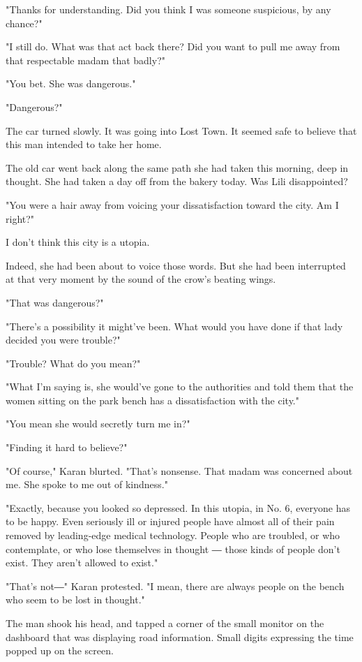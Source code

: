 "Thanks for understanding. Did you think I was someone suspicious, by
any chance?"

"I still do. What was that act back there? Did you want to pull me away
from that respectable madam that badly?"

"You bet. She was dangerous."

"Dangerous?"

The car turned slowly. It was going into Lost Town. It seemed safe to
believe that this man intended to take her home.

The old car went back along the same path she had taken this morning,
deep in thought. She had taken a day off from the bakery today. Was Lili
disappointed?

"You were a hair away from voicing your dissatisfaction toward the city.
Am I right?"

I don't think this city is a utopia.

Indeed, she had been about to voice those words. But she had been
interrupted at that very moment by the sound of the crow's beating
wings.

"That was dangerous?"

"There's a possibility it might've been. What would you have done if
that lady decided you were trouble?"

"Trouble? What do you mean?"

"What I'm saying is, she would've gone to the authorities and told them
that the women sitting on the park bench has a dissatisfaction with the
city."

"You mean she would secretly turn me in?"

"Finding it hard to believe?"

"Of course," Karan blurted. "That's nonsense. That madam was concerned
about me. She spoke to me out of kindness."

"Exactly, because you looked so depressed. In this utopia, in No. 6,
everyone has to be happy. Even seriously ill or injured people have
almost all of their pain removed by leading-edge medical technology.
People who are troubled, or who contemplate, or who lose themselves in
thought ― those kinds of people don't exist. They aren't allowed to
exist."

"That's not―" Karan protested. "I mean, there are always people on the
bench who seem to be lost in thought."

The man shook his head, and tapped a corner of the small monitor on the
dashboard that was displaying road information. Small digits expressing
the time popped up on the screen.

